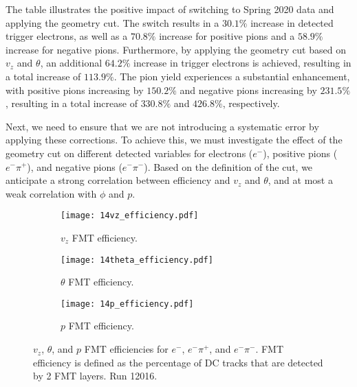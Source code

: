    The table illustrates the positive impact of switching to Spring 2020 data and applying the geometry cut.
    The switch results in a $30.1\%$ increase in detected trigger electrons, as well as a $70.8\%$ increase for positive pions and a $58.9\%$ increase for negative pions.
    Furthermore, by applying the geometry cut based on $v_z$ and $\theta$, an additional $64.2\%$ increase in trigger electrons is achieved, resulting in a total increase of $113.9\%$.
    The pion yield experiences a substantial enhancement, with positive pions increasing by $150.2\%$ and negative pions increasing by $231.5\%$, resulting in a total increase of $330.8\%$ and $426.8\%$, respectively.

    Next, we need to ensure that we are not introducing a systematic error by applying these corrections.
    To achieve this, we must investigate the effect of the geometry cut on different detected variables for electrons ($e^-$), positive pions ($e^-\pi^+$), and negative pions ($e^-\pi^-$).
    Based on the definition of the cut, we anticipate a strong correlation between efficiency and $v_z$ and $\theta$, and at most a weak correlation with $\phi$ and $p$.

    \begin{figure}
        \begin{subfigure}[b]{\textwidth}
            \texttt{[image: 14vz\_efficiency.pdf]}
            \caption{$v_z$ FMT efficiency.}
            \label{fig::14.14::fmt_efficiency_vz}
        \end{subfigure}
        \begin{subfigure}[b]{\textwidth}
            \texttt{[image: 14theta\_efficiency.pdf]}
            \caption{$\theta$ FMT efficiency.}
            \label{fig::14.14::fmt_efficiency_theta}
        \end{subfigure}
        \begin{subfigure}[b]{\textwidth}
            \texttt{[image: 14p\_efficiency.pdf]}
            \caption{$p$ FMT efficiency.}
            \label{fig::14.14::fmt_efficiency_p}
        \end{subfigure}

        \caption[$v_z$, $\theta$, and $p$ FMT efficiencies for $e^-$, $e^-\pi^+$, and $e^-\pi^-$ in run 12016]
        {$v_z$, $\theta$, and $p$ FMT efficiencies for $e^-$, $e^-\pi^+$, and $e^-\pi^-$.
        FMT efficiency is defined as the percentage of DC tracks that are detected by 2 FMT layers.
        Run 12016.}
        \label{fig::14.14::fmt_efficiencies}
    \end{figure}

